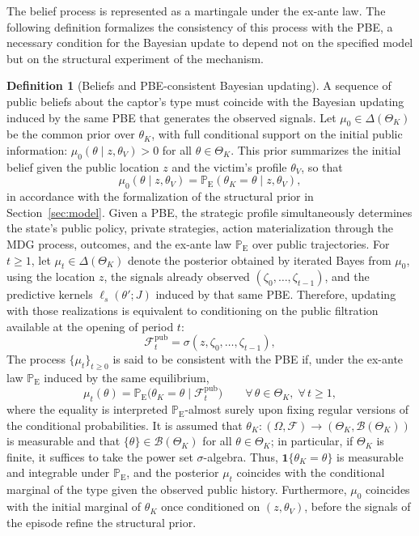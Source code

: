\documentclass[review,authoryear,12pt]{elsarticle}
\theoremstyle{plain}
\theoremstyle{definition}
\newtheorem{definition}[theorem]{Definition}
\newcommand{\ProbE}{\mathbb{P}_{\mathrm{E}}}
\newcommand{\ThetaK}{\Theta_K}
\newcommand{\1}{\mathbf{1}}
\begin{document}
The belief process is represented as a martingale under the ex-ante law. The following definition formalizes the consistency of this process with the PBE, a necessary condition for the Bayesian update to depend not on the specified model but on the structural experiment of the mechanism.

\begin{definition}[Beliefs and PBE-consistent Bayesian updating]\label{def:beliefs-martingale}
A sequence of public beliefs about the captor's type must coincide with the Bayesian updating induced by the same PBE that generates the observed signals. Let $\mu_0\in\Delta(\ThetaK)$ be the common prior over $\theta_K$, with full conditional support on the initial public information: $\mu_0(\theta \mid z,\theta_V)>0$ for all $\theta\in\ThetaK$. This prior summarizes the initial belief given the public location $z$ and the victim's profile $\theta_V$, so that
\[
\mu_0(\theta \mid z,\theta_V)=\ProbE(\theta_K=\theta\mid z,\theta_V),
\]
in accordance with the formalization of the structural prior in Section~\ref{sec:model}. Given a PBE, the strategic profile simultaneously determines the state's public policy, private strategies, action materialization through the MDG process, outcomes, and the ex-ante law $\ProbE$ over public trajectories. For $t\ge 1$, let $\mu_t\in\Delta(\ThetaK)$ denote the posterior obtained by iterated Bayes from $\mu_0$, using the location $z$, the signals already observed $(\zeta_0,\ldots,\zeta_{t-1})$, and the predictive kernels $\ell_s(\theta';J)$ induced by that same PBE. Therefore, updating with those realizations is equivalent to conditioning on the public filtration available at the opening of period $t$:
\[
\mathcal{F}_t^{\mathrm{pub}}=\sigma(z,\zeta_0,\ldots,\zeta_{t-1}),
\]
The process $\{\mu_t\}_{t\ge 0}$ is said to be consistent with the PBE if, under the ex-ante law $\ProbE$ induced by the same equilibrium,
\begin{equation}
\label{eq:beliefs-ebp-consistency}
\mu_t(\theta)=\ProbE\bigl(\theta_K=\theta\mid\mathcal{F}_t^{\mathrm{pub}}\bigr)\qquad \forall\,\theta\in\ThetaK,\;\forall\,t\ge 1,
\end{equation}
where the equality is interpreted $\ProbE$-almost surely upon fixing regular versions of the conditional probabilities. It is assumed that $\theta_K:(\Omega,\mathcal{F})\to(\ThetaK,\mathcal{B}(\ThetaK))$ is measurable and that $\{\theta\}\in\mathcal{B}(\ThetaK)$ for all $\theta\in\ThetaK$; in particular, if $\ThetaK$ is finite, it suffices to take the power set $\sigma$-algebra. Thus, $\mathbf{1}\{\theta_K=\theta\}$ is measurable and integrable under $\ProbE$, and the posterior $\mu_t$ coincides with the conditional marginal of the type given the observed public history. Furthermore, $\mu_0$ coincides with the initial marginal of $\theta_K$ once conditioned on $(z, \theta_V)$, before the signals of the episode refine the structural prior.
\end{definition}
\end{document}

